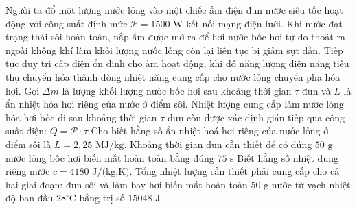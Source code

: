 \begin{ex}	Người ta đổ một lượng nước lỏng vào một chiếc ấm điện đun nước siêu tốc hoạt động với công suất định mức $\mathcal{P} = 1500\text{ W}$ kết nối mạng điện lưới. Khi nước đạt trạng thái sôi hoàn toàn, nắp ấm được mở ra để hơi nước bốc hơi tự do thoát ra ngoài không khí làm khối lượng nước lỏng còn lại liên tục bị giảm sụt dần. Tiếp tục duy trì cấp điện ổn định cho ấm hoạt động, khi đó năng lượng điện năng tiêu thụ chuyển hóa thành dòng nhiệt năng cung cấp cho nước lỏng chuyển pha hóa hơi. Gọi $\Delta m$ là lượng khối lượng nước bốc hơi sau khoảng thời gian $\tau$ đun và $L$ là ẩn nhiệt hóa hơi riêng của nước ở điểm sôi.
	{\True Nhiệt lượng cung cấp làm nước lỏng hóa hơi bốc đi sau khoảng thời gian $\tau$ đun còn được xác định gián tiếp qua công suất điện: $Q = \mathcal{P} \cdot \tau$}
	{\True Cho biết hằng số ẩn nhiệt hoá hơi riêng của nước lỏng ở điểm sôi là $L = 2,25\text{ MJ/kg}$. Khoảng thời gian đun cần thiết để có đúng $50\text{ g}$ nước lỏng bốc hơi biến mất hoàn toàn bằng đúng $75\text{ s}$}
	{Biết hằng số nhiệt dung riêng nước $c = 4180\text{ J/(kg.K)}$. Tổng nhiệt lượng cần thiết phải cung cấp cho cả hai giai đoạn: đun sôi và làm bay hơi biến mất hoàn toàn $50\text{ g}$ nước từ vạch nhiệt độ ban đầu $28^\circ\text{C}$ bằng trị số $15048\text{ J}$}
\end{ex}

